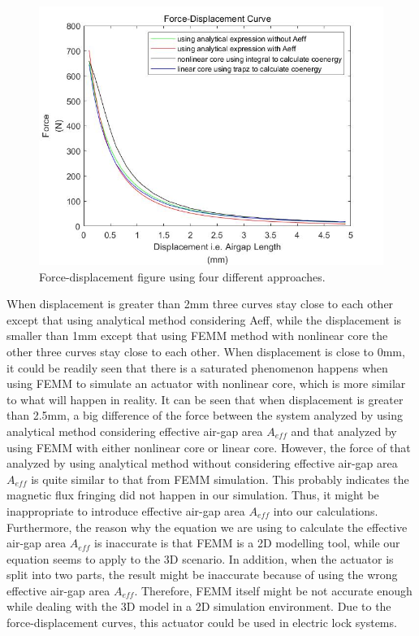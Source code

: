 \documentclass[a4paper]{IEEEtran}
\begin{document}
{\begin{figure}[!ht]
\begin{centering}
\includegraphics[scale=0.35]{force-displacement.jpg}
\par\end{centering}   
\caption{Force-displacement figure using four different approaches.\label{force-displacement}}
\end{figure} 

When displacement is greater than 2mm 
three curves stay close to each other except that using analytical
method considering Aeff, while the displacement is smaller than 1mm except that
using FEMM method with nonlinear core the other three curves stay close to each other.
When displacement is close to 0mm, it could be readily seen that there is a saturated phenomenon
happens when using FEMM to simulate an actuator with nonlinear core, which is more similar to what will 
happen in reality. It can be seen that when displacement is greater than 2.5mm, a big difference of the force between the system analyzed by using analytical method 
considering effective air-gap area $A_{eff}$ and that analyzed by using FEMM with either nonlinear core or linear core.
However, the force of that analyzed by using analytical method without considering effective air-gap area $A_{eff}$ is quite similar 
to that from FEMM simulation. This probably indicates the magnetic flux fringing did not happen in our simulation. 
Thus, it might be inappropriate to introduce effective air-gap area $A_{eff}$ into our calculations. Furthermore, the reason why the equation we are using to calculate
the effective air-gap area $A_{eff}$ is inaccurate is that FEMM is a 2D modelling tool, while our equation seems to apply to the 3D scenario. In addition,
when the actuator is split into two parts, the result might be inaccurate because of using the wrong effective air-gap area $A_{eff}$. Therefore, FEMM itself might be 
not accurate enough while dealing with the 3D model in a 2D simulation environment. Due to the force-displacement curves, this actuator could be used in electric lock systems\cite{actuator_lock}.

}
\end{document}
